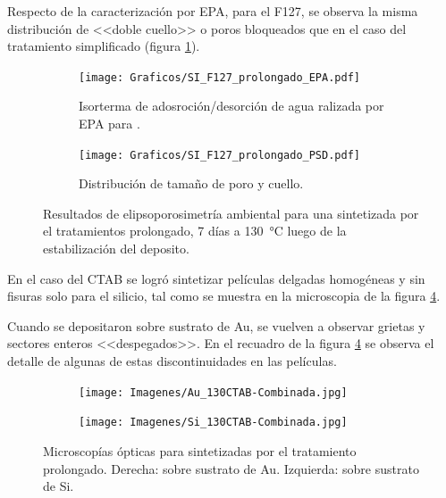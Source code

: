 {		Respecto de la caracterización por EPA, para el F127, se observa la misma distribución de <<doble cuello>> o poros bloqueados que en el caso del tratamiento simplificado (figura \ref{fig:F127_prolongado_EPA}). 

		 \begin{figure}[!ht]
			  	\begin{subfigure}[t]{0.495\textwidth}
			  	\texttt{[image: Graficos/SI\_F127\_prolongado\_EPA.pdf]}
				\caption{Isorterma de adosroción/desorción de agua ralizada por EPA para \pdmF.}
				\label{fig:F127_prolongado_EPA}
				\end{subfigure}
				\begin{subfigure}[t]{0.495\textwidth}
			  	\texttt{[image: Graficos/SI\_F127\_prolongado\_PSD.pdf]}
				\caption{Distribución de tamaño de poro y cuello.\\ }
				\label{fig:F127_prolongado_PSD}
				\end{subfigure}
				\caption[Elipsoporosimetría \pdmF\space tratamiento prolongado.]{Resultados de elipsoporosimetría ambiental para una \pdmF\space sintetizada por el tratamientos prolongado, 7 días a \SI{130}{\celsius} luego de la estabilización del deposito.}
		 		\end{figure}

		En el caso del CTAB se logró sintetizar películas delgadas homogéneas y sin fisuras solo para el silicio, tal como 
		se muestra en la microscopia de la figura \ref{fig:Microscopia_CTAB_prolongado}. 

		Cuando se depositaron sobre sustrato de Au, se vuelven a observar grietas y sectores enteros <<despegados>>. En el recuadro de la figura \ref{fig:Microscopia_CTAB_prolongado} se observa el detalle de algunas de estas discontinuidades en las películas. 		
		 \begin{figure}[!th]
	 	   	    \begin{subfigure}[t]{0.49\textwidth}
		       	\texttt{[image: Imagenes/Au\_130CTAB-Combinada.jpg]}
		   		\end{subfigure}
		   		\begin{subfigure}[t]{0.49\textwidth}
		   	    \texttt{[image: Imagenes/Si\_130CTAB-Combinada.jpg]}
		   		\end{subfigure}
				 \caption[Microscopía óptica \pdmC\space tratamiento prolongado.]{Microscopías ópticas para \pdmC\space sintetizadas por el tratamiento prolongado. Derecha: sobre sustrato de Au. Izquierda: sobre sustrato de Si.}
				 \label{fig:Microscopia_CTAB_prolongado}	
			     \end{figure}	
			     
}
